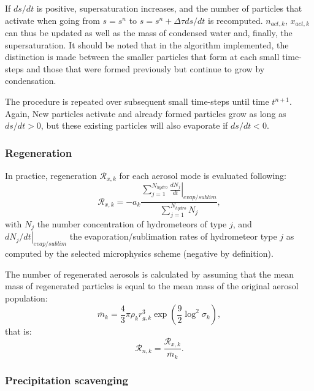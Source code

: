 \documentclass[12pt,A4,french]{article}
\begin{document}
If $ds/dt$ is positive, supersaturation increases, and the number of  particles that activate when going from $s = s^n$ to $s = s^n + \Delta\tau ds/dt$ is recomputed. $n_{act,k}$, $x_{act,k}$ can thus be updated as well as the mass of condensed water and, finally, the supersaturation. It should be noted that in the algorithm implemented, the distinction is made between the smaller particles that form at each small time-steps and those that were formed previously but continue to grow by condensation.

The procedure is repeated over subsequent small time-steps until time $t^{n+1}$. Again, New particles activate and already formed particles grow as long as $ds/dt > 0$, but these existing particles will also evaporate if $ds/dt < 0$.

\subsubsection{Regeneration}

In practice, regeneration $\mathcal{R}_{x,k}$ for each aerosol mode is evaluated following:
\begin{equation}
    \mathcal{R}_{x,k} = -a_k\frac{\sum_{j=1}^{N_{hydro}} \left.\frac{d N_{j}}{d t}\right|_{evap/sublim}}{\sum_{j=1}^{N_{hydro}} N_j},
\end{equation}
with $N_{j}$ the number concentration of hydrometeors of type $j$, and $\left.d N_{j}/dt\right|_{evap/sublim}$ the evaporation/sublimation rates of hydrometeor type $j$ as computed by the selected microphysics scheme (negative by definition).
 
The number of regenerated aerosols is calculated by assuming that the mean mass of regenerated particles is equal to the mean mass of the original aerosol population:
\begin{equation}
    \overline{m}_k = \frac{4}{3}\pi\rho_k r_{g,k}^3 \exp\left(\frac{9}{2}\log^2 \sigma_k\right),
\end{equation}
that is:
\begin{equation}
    \mathcal{R}_{n,k} = \frac{\mathcal{R}_{x,k}}{\overline{m}_k}.
\end{equation}

\subsubsection{Precipitation scavenging}
\end{document}
